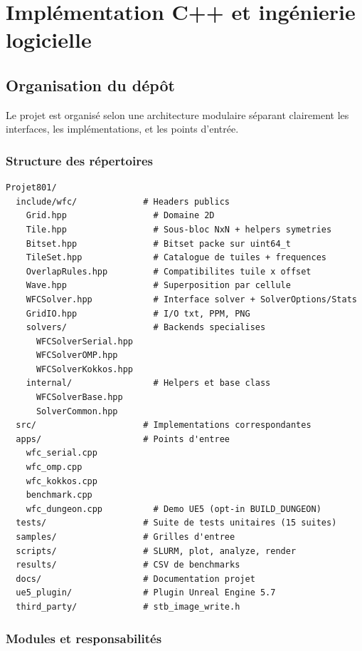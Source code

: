 \chapter{Implémentation C++ et ingénierie logicielle}
\label{chap:implementation}

\section{Organisation du dépôt}

Le projet est organisé selon une architecture modulaire séparant clairement les interfaces, les implémentations, et les points d'entrée.

\subsection{Structure des répertoires}

\begin{verbatim}
Projet801/
  include/wfc/             # Headers publics
    Grid.hpp                 # Domaine 2D
    Tile.hpp                 # Sous-bloc NxN + helpers symetries
    Bitset.hpp               # Bitset packe sur uint64_t
    TileSet.hpp              # Catalogue de tuiles + frequences
    OverlapRules.hpp         # Compatibilites tuile x offset
    Wave.hpp                 # Superposition par cellule
    WFCSolver.hpp            # Interface solver + SolverOptions/Stats
    GridIO.hpp               # I/O txt, PPM, PNG
    solvers/                 # Backends specialises
      WFCSolverSerial.hpp
      WFCSolverOMP.hpp
      WFCSolverKokkos.hpp
    internal/                # Helpers et base class
      WFCSolverBase.hpp
      SolverCommon.hpp
  src/                     # Implementations correspondantes
  apps/                    # Points d'entree
    wfc_serial.cpp
    wfc_omp.cpp
    wfc_kokkos.cpp
    benchmark.cpp
    wfc_dungeon.cpp          # Demo UE5 (opt-in BUILD_DUNGEON)
  tests/                   # Suite de tests unitaires (15 suites)
  samples/                 # Grilles d'entree
  scripts/                 # SLURM, plot, analyze, render
  results/                 # CSV de benchmarks
  docs/                    # Documentation projet
  ue5_plugin/              # Plugin Unreal Engine 5.7
  third_party/             # stb_image_write.h
\end{verbatim}

\subsection{Modules et responsabilités}

